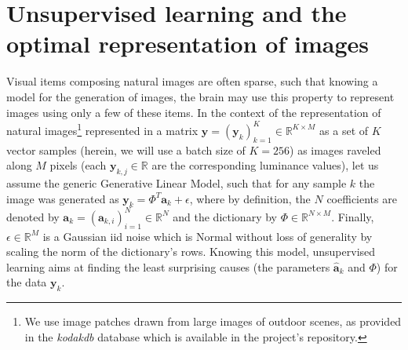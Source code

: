 \documentclass[vision,article,submit,oneauthor,pdftex]{Definitions/mdpi}
\newcommand{\coef}{\mathbf{a}} %
\newcommand{\image}{\mathbf{y}} %
\newcommand{\dico}{\Phi} %
\newcommand{\eqdef}{\ensuremath{\stackrel{\mbox{\upshape\tiny def.}}{=}}}
\newcommand{\RR}{\mathbb{R}}
\begin{document}
\section{Unsupervised learning and the optimal representation of images}%
%
%
% 
Visual items composing natural images are often sparse, such that knowing a model for the generation of images, the brain may use this property to represent images using only a few of these items.
In the context of the representation of natural images\footnote{We use image patches drawn from large images of outdoor scenes, as provided in the \emph{kodakdb} database which is available in the project's repository. %
} represented in a matrix $\image = (\image_k)_{k=1}^K \in \RR^{K \times M}$ as a set of $K$ vector samples (herein, we will use a batch size of $K=256$) as images raveled along $M$ pixels (each $\image_{k, j} \in \RR$ are the corresponding luminance values), let us assume the generic Generative Linear Model, such that for any sample $k$ the image was generated as $\image_k = \dico^T \coef_{k} + \epsilon $, where by definition, the $N$ coefficients are denoted by $\coef_{k} = (\coef_{k, i})_{i=1}^N \in \RR^{N}$ and the dictionary by $\dico \in \RR^{N \times M}$. Finally, $\epsilon \in \RR^{M}$ is a Gaussian iid noise which is Normal without loss of generality by scaling the norm of the dictionary's rows. Knowing this model, unsupervised learning aims at finding the least surprising causes (the parameters $\hat{\coef}_{k}$ and $\dico$) for the data $\image_k$.
\end{document}
